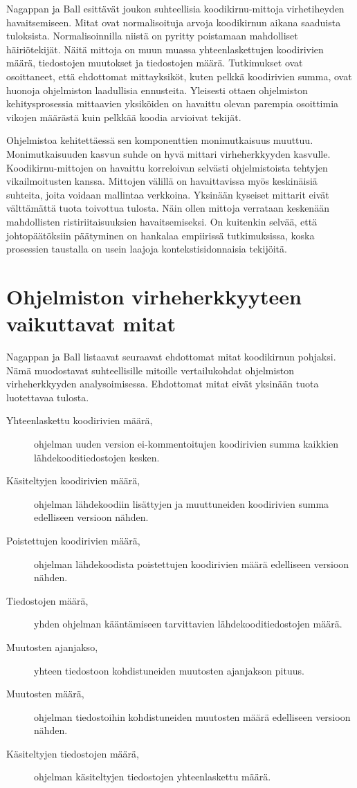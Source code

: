 \documentclass[finnish]{../tktltiki2}
\theoremstyle{definition}
\theoremstyle{remark}
\begin{document}
Nagappan ja Ball esittävät joukon suhteellisia koodikirnu-mittoja virhetiheyden havaitsemiseen. Mitat ovat normalisoituja arvoja koodikirnun aikana saaduista tuloksista. Normalisoinnilla niistä on pyritty poistamaan mahdolliset häiriötekijät. Näitä mittoja on muun muassa yhteenlaskettujen koodirivien määrä, tiedostojen muutokset ja tiedostojen määrä. Tutkimukset ovat osoittaneet, että ehdottomat mittayksiköt, kuten pelkkä koodirivien summa, ovat huonoja ohjelmiston laadullisia ennusteita. Yleisesti ottaen ohjelmiston kehitysprosessia mittaavien yksiköiden on havaittu olevan parempia osoittimia vikojen määrästä kuin pelkkää koodia arvioivat tekijät.

Ohjelmistoa kehitettäessä sen komponenttien monimutkaisuus muuttuu. Monimutkaisuuden kasvun suhde on hyvä mittari virheherkkyyden kasvulle. Koodikirnu-mittojen on havaittu korreloivan selvästi ohjelmistoista tehtyjen vikailmoitusten kanssa. Mittojen välillä on havaittavissa myös keskinäisiä suhteita, joita voidaan mallintaa verkkoina. Yksinään kyseiset mittarit eivät välttämättä tuota toivottua tulosta. Näin ollen mittoja verrataan keskenään mahdollisten ristiriitaisuuksien havaitsemiseksi. On kuitenkin selvää, että johtopäätöksiin päätyminen on hankalaa empiirissä tutkimuksissa, koska prosessien taustalla on usein laajoja kontekstisidonnaisia tekijöitä.

\section{Ohjelmiston virheherkkyyteen vaikuttavat mitat}

Nagappan ja Ball listaavat seuraavat ehdottomat mitat koodikirnun pohjaksi. Nämä muodostavat suhteellisille mitoille vertailukohdat ohjelmiston virheherkkyyden analysoimisessa. Ehdottomat mitat eivät yksinään tuota luotettavaa tulosta.

\begin{description}
    \item[Yhteenlaskettu koodirivien määrä,] ohjelman uuden version ei-kommen\-toitujen koodirivien summa kaikkien lähdekooditiedostojen kesken.
    \item[Käsiteltyjen koodirivien määrä,] ohjelman lähdekoodiin lisättyjen ja muuttuneiden koodirivien summa edelliseen versioon nähden.
    \item[Poistettujen koodirivien määrä,] ohjelman lähdekoodista poistettujen koodirivien määrä edelliseen versioon nähden.
    \item[Tiedostojen määrä,] yhden ohjelman kääntämiseen tarvittavien lähdekoodi\-tiedostojen määrä.
    \item[Muutosten ajanjakso,] yhteen tiedostoon kohdistuneiden muutosten ajanjakson pituus.
    \item[Muutosten määrä,] ohjelman tiedostoihin kohdistuneiden muutosten määrä edelliseen versioon nähden.
    \item[Käsiteltyjen tiedostojen määrä,] ohjelman käsiteltyjen tiedostojen yhteenlaskettu määrä.
\end{description}
\end{document}
